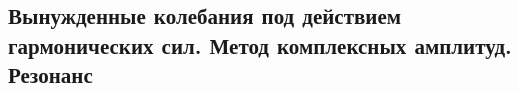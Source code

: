 

\subsection{Вынужденные колебания под действием гармонических сил. Метод комплексных амплитуд. Резонанс}



